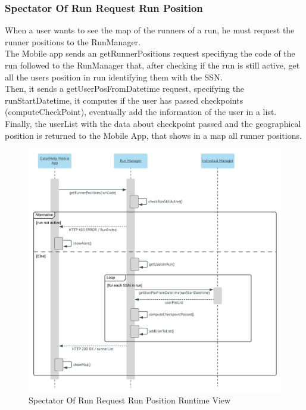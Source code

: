 \subsubsection{Spectator Of Run Request Run Position}
When a user wants to see the map of the runners of a run, he must request the runner positions to the RunManager.\\
The Mobile app sends an getRunnerPositions request specifiyng the code of the run followed to the RunManager that, after checking if the run is still active, get all the users position in run identifying them with the SSN.\\ Then, it sends a getUserPosFromDatetime request, specifying the runStartDatetime, it computes if the user has passed checkpoints (computeCheckPoint), eventually add the information of the user in a list. \\
Finally, the userList with the data about checkpoint passed and the geographical position is returned to the Mobile App, that shows in a map all runner positions.


\begin{figure}[H]
	\includegraphics[width=\textwidth,height=\textheight,keepaspectratio]{assets/flowCharts/SpectatorOfRunRequestRunPosition.pdf}
	\caption{Spectator Of Run Request Run Position Runtime View}
	\label{fig:SpectatorOfRunRequestRunPosition}
\end{figure}